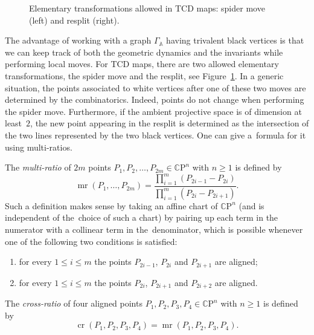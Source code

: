 \documentclass[pdftex]{sigma}
\numberwithin{equation}{section}
\newcommand{\CP}{{\mathbb C\mathrm P}}
\newcommand{\A}{{\mathbb A}}
\def\cro{\operatorname{cr}}
\def\mr{\operatorname{mr}}
\begin{document}
\begin{figure}[ht]
		
		\caption{Elementary transformations allowed in TCD maps: spider move (left) and resplit (right).}\label{fig:localmoves}
	\end{figure}
	
	The advantage of working with a graph $\Gamma_\A$ having trivalent black vertices is that we can keep track of both the geometric dynamics and the invariants while performing local moves. For TCD maps, there are two allowed elementary transformations, the spider move and the resplit, see Figure~\ref{fig:localmoves}. In a generic situation, the points associated to white vertices after one of these two moves are determined by the combinatorics. Indeed, points do not change when performing the spider move. Furthermore, if the ambient projective space is of dimension at least~$2$, the new point appearing in the resplit is determined as the intersection of the two lines represented by the two black vertices. One can give a~formula for it using multi-ratios.
	
	The \emph{multi-ratio} of $2m$ points $P_1,P_2,\dots,P_{2m}\in \CP^n$ with $n\geq1$ is defined by
	\[
\mr(P_1,\dots,P_{2m})=\frac{\prod\limits_{i=1}^m (P_{2i-1}-P_{2i})}{\prod\limits_{i=1}^m (P_{2i}-P_{2i+1})}.
	\]
	Such a definition makes sense by taking an affine chart of $\CP^n$ (and is independent of the~choice of such a chart) by pairing up each term in the numerator with a collinear term in the~denominator, which is possible whenever one of the following two conditions is satisfied:
	\begin{enumerate}\itemsep=0pt
		\item[(1)] for every $1\leq i\leq m$ the points $P_{2i-1}$, $P_{2i}$ and $P_{2i+1}$ are aligned;
		\item[(2)] for every $1\leq i\leq m$ the points $P_{2i}$, $P_{2i+1}$ and $P_{2i+2}$ are aligned.
	\end{enumerate}
	The \emph{cross-ratio} of four aligned points $P_1,P_2,P_3,P_4\in \CP^n$ with $n\geq1$ is defined by
	\[
		\cro(P_1,P_2,P_3,P_4)=\mr(P_1,P_2,P_3,P_4).
	\]
	
\end{document}

